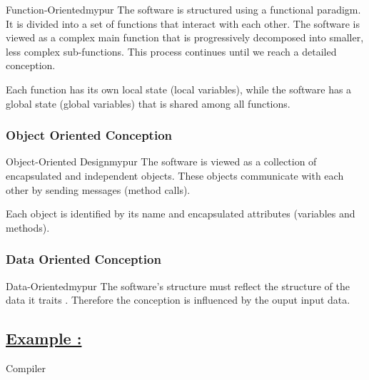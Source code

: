 \vspace{0.25cm}
\begin{prettyBox}{Function-Oriented}{mypur}
    The software is structured using a functional paradigm. It is divided into a set of functions 
that interact with each other. The software is viewed as a complex main function that is 
progressively decomposed into smaller, less complex sub-functions. This process continues until
we reach a detailed conception.

    \vspace{0.15cm}
    Each function has its own local state (local variables), while the software has
a global state (global variables) that is shared among all functions.
\end{prettyBox}

\vspace{0.5cm}
\subsubsection{Object Oriented Conception}

\vspace{0.25cm}

\begin{prettyBox}{Object-Oriented Design}{mypur}
    The software is viewed as a collection of encapsulated and independent objects. 
These objects communicate with each other by sending messages (method calls).

    \vspace{0.15cm}
    Each object is identified by its name and encapsulated attributes (variables and methods).
\end{prettyBox}


\vspace{0.5cm}

\subsubsection{Data Oriented Conception}

\vspace{0.25cm}

\begin{prettyBox}{Data-Oriented}{mypur}
    The software's structure must reflect the structure of the data it traits .
    Therefore the conception is influenced by the ouput input data.
\end{prettyBox}


\subsection*{\underline{Example :}}
Compiler

